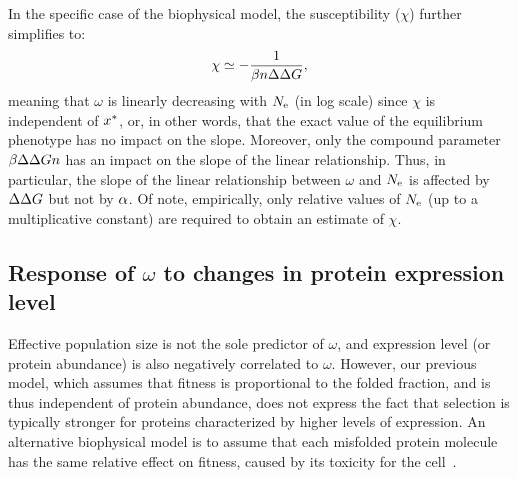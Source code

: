 In the specific case of the biophysical model, the susceptibility ($\chi$) further simplifies to:
\begin{gather}
    \chi \simeq -\dfrac{1}{\beta \NbrSites \DeltaDeltaG}, \label{eq:chi_application}
\end{gather}
meaning that $\omega$ is linearly decreasing with $N_{\text{e}}$ (in log scale) since $\chi$ is independent of $x^{*}$, or, in other words, that the exact value of the equilibrium phenotype has no impact on the slope.
Moreover, only the compound parameter $\beta \Delta \Delta G n$ has an impact on the slope of the linear relationship.
Thus, in particular, the slope of the linear relationship between $\omega$ and $N_{\text{e}}$ is affected by $\Delta \Delta G$ but not by $\alpha$.
Of note, empirically, only relative values of $N_{\text{e}}$ (up to a multiplicative constant) are required to obtain an estimate of $\chi$.

\subsection{Response of \texorpdfstring{$\omega$}{ω} to changes in protein expression level}
\label{sec:expression}

Effective population size is not the sole predictor of $\omega$, and expression level (or protein abundance) is also negatively correlated to $\omega$.
However, our previous model, which assumes that fitness is proportional to the folded fraction, and is thus independent of protein abundance, does not express the fact that selection is typically stronger for proteins characterized by higher levels of expression.
An alternative biophysical model is to assume that each misfolded protein molecule has the same relative effect on fitness, caused by its toxicity for the cell~\citep{Drummond2005a, Wilke2006, Drummond2008, Serohijos2012}.

